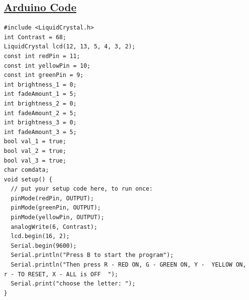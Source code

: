 \documentclass[a4paper]{article}
\begin{document}
\subsection{\underline{Arduino Code}}
\begin{lstlisting}[language=Arduino]
#include <LiquidCrystal.h>
int Contrast = 68;
LiquidCrystal lcd(12, 13, 5, 4, 3, 2);
const int redPin = 11;
const int yellowPin = 10;
const int greenPin = 9;
int brightness_1 = 0;
int fadeAmount_1 = 5;
int brightness_2 = 0;
int fadeAmount_2 = 5;
int brightness_3 = 0;
int fadeAmount_3 = 5;
bool val_1 = true;
bool val_2 = true;
bool val_3 = true;
char comdata;
void setup() {
  // put your setup code here, to run once:
  pinMode(redPin, OUTPUT);
  pinMode(greenPin, OUTPUT);
  pinMode(yellowPin, OUTPUT);
  analogWrite(6, Contrast);
  lcd.begin(16, 2);
  Serial.begin(9600);
  Serial.println("Press B to start the program");
  Serial.println("Then press R - RED ON, G - GREEN ON, Y -  YELLOW ON, r - TO RESET, X - ALL is OFF  ");
  Serial.print("choose the letter: ");
}


\end{lstlisting}
\end{document}

